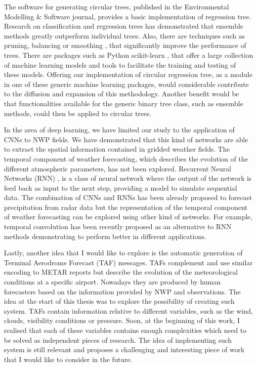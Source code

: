 \medskip

The software for generating circular trees, published in the Environmental Modelling & Software journal, provides a basic implementation of regression tree. Research on classification and regression trees has demonstrated that ensemble methods greatly outperform individual trees. Also, there are techniques such as pruning, balancing or smoothing \citep{breiman1984classification,quinlan1993}, that significantly improve the performance of trees. There are packages such as Python scikit-learn \citep{pedregosa2011scikit}, that offer a large collection of machine learning models and tools to facilitate the training and testing of these models. Offering our implementation of circular regression tree, as a module in one of these generic machine learning packages, would considerable contribute to the diffusion and expansion of this methodology. Another benefit would be that functionalities available for the generic binary tree class, such as ensemble methods, could then be applied to circular trees.

\medskip

In the area of deep learning, we have limited our study to the application of CNNs to NWP fields. We have demonstrated that this kind of networks are able to extract the spatial information contained in gridded weather fields. The temporal component of weather forecasting, which describes the evolution of the different atmospheric parameters, has not been explored. Recurrent Neural Networks (RNN) \citep{williams1989learning}, is a class of neural network where the output of the network is feed back as input to the next step, providing a model to simulate sequential data. The combination of CNNs and RNNs has been already proposed to forecast precipitation from radar data \citep{xingjian2015convolutional} but the representation of the temporal component of weather forecasting can be explored using other kind of networks. For example, temporal convolution \citep{bai2018empirical} has been recently proposed as an alternative to RNN methods demonstrating to perform better in different applications.

\medskip

Lastly, another idea that I would like to explore is the automatic generation of Terminal Aerodrome Forecast (TAF) messages. TAFs complement and use similar encoding to METAR reports but describe the evolution of the meteorological conditions at a specific airport. Nowadays they are produced by human forecasters based on the information provided by NWP and observations. The idea at the start of this thesis was to explore the possibility of creating such system. TAFs contain information relative to different variables, such as the wind, clouds, visibility conditions or pressure. Soon, at the beginning of this work, I realised that each of these variables contains enough complexities which need to be solved as independent pieces of research. The idea of implementing such system is still relevant and proposes a challenging and interesting piece of work that I would like to consider in the future.

